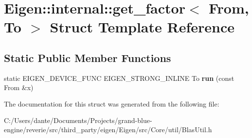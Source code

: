 \hypertarget{struct_eigen_1_1internal_1_1get__factor}{}\section{Eigen\+::internal\+::get\+\_\+factor$<$ From, To $>$ Struct Template Reference}
\label{struct_eigen_1_1internal_1_1get__factor}
\subsection*{Static Public Member Functions}
\begin{DoxyCompactItemize}
\item 
\mbox{\label{struct_eigen_1_1internal_1_1get__factor_abd089598b5a53790ba0d920340ea7b2b}} 
static E\+I\+G\+E\+N\+\_\+\+D\+E\+V\+I\+C\+E\+\_\+\+F\+U\+NC E\+I\+G\+E\+N\+\_\+\+S\+T\+R\+O\+N\+G\+\_\+\+I\+N\+L\+I\+NE To {\bfseries run} (const From \&x)
\end{DoxyCompactItemize}


The documentation for this struct was generated from the following file\+:\begin{DoxyCompactItemize}
\item 
C\+:/\+Users/dante/\+Documents/\+Projects/grand-\/blue-\/engine/reverie/src/third\+\_\+party/eigen/\+Eigen/src/\+Core/util/Blas\+Util.\+h\end{DoxyCompactItemize}

